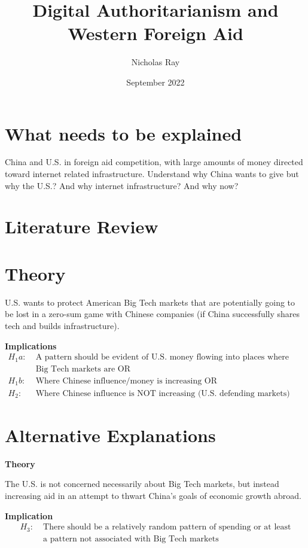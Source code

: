 \documentclass{article}
\title{Digital Authoritarianism and Western Foreign Aid}
\author{Nicholas Ray}
\date{September 2022}
\begin{document}
\maketitle
\section*{What needs to be explained} 
China and U.S. in foreign aid competition, with large amounts of money directed toward internet related infrastructure.
Understand why China wants to give but why the U.S.? And why internet infrastructure? And why now?

\section*{Literature Review}


\section*{Theory} 
U.S. wants to protect American Big Tech markets that are potentially going to be lost in a zero-sum game with Chinese companies (if China successfully shares tech and builds infrastructure).

\textbf{Implications} 
\begin{align*}
    H_1a:\; & \text{A pattern should be evident of U.S. money flowing into places where either}\\
    & \text{Big Tech markets are OR}\\
    H_1b:\; & \text{Where Chinese influence/money is increasing OR}\\
    H_2:\; & \text{Where Chinese influence is NOT increasing (U.S. defending markets)}
\end{align*}

\section*{Alternative Explanations}
\textbf{Theory}

The U.S. is not concerned necessarily about Big Tech markets, but instead increasing aid in an attempt to thwart China's goals of economic growth abroad.

\textbf{Implication}
\begin{align*}
    H_3:\; & \text{There should be a relatively random pattern of spending or at least}\\
    & \text{a pattern not associated with Big Tech markets}
\end{align*}
\end{document}
